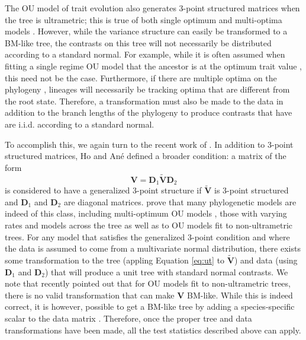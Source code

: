 The OU model of trait evolution also generates 3-point structured matrices when the tree is ultrametric; this is true of both single optimum and multi-optima models \citep{Ho2014}.
However, while the variance structure can easily be transformed to a BM-like tree, the contrasts on this tree will not necessarily be distributed according to a standard normal. For example, while it is often assumed when fitting a single regime OU model that the ancestor is at the optimum trait value \citep[see, for example][]{Harmon2010}, this need not be the case. Furthermore, if there are multiple optima on the phylogeny \citep{Hansen1997, ButlerKing2004, IngramMahler2013, UyedaBayou}, lineages will necessarily be tracking optima that are different from the root state. Therefore, a transformation must also be made to the data in addition to the branch lengths of the phylogeny to produce contrasts that have are i.i.d. according to a standard normal.

To accomplish this, we again turn to the recent work of \citet{Ho2014}. In addition to 3-point structured matrices, Ho and An\'{e} defined a broader condition: a matrix of the form
\[\mathbf{V}=\mathbf{D}_{\text{1}} \widetilde{\mathbf{V}}\mathbf{D}_{\text{2}}\]
is considered to have a generalized 3-point structure if $\widetilde{\mathbf{V}}$ is 3-point structured and $\mathbf{D}_{\text{1}}$ and $\mathbf{D}_{\text{2}}$ are diagonal matrices. \citet{Ho2014} prove that many phylogenetic models are indeed of this class, including multi-optimum OU models \citep{ButlerKing2004, IngramMahler2013, UyedaBayou}, those with varying rates and models across the tree \citep[e.g.,][]{Beaulieu2012} as well as to OU models fit to non-ultrametric trees. For any model that satisfies the generalized 3-point condition and where the data is assumed to come from a multivariate normal distribution, there exists some transformation to the tree (appling Equation \ref{eq:ut} to $\widetilde{\mathbf{V}}$) and data (using $\mathbf{D}_{\text{1}}$ and $\mathbf{D}_{\text{2}}$) that will produce a unit tree with standard normal contrasts. We note that \citet{Slater2014} recently pointed out that for OU models fit to non-ultrametric trees, there is no valid transformation that can make $\mathbf{V}$ BM-like. While this is indeed correct, it is however, possible to get a BM-like tree by adding a species-specific scalar to the data matrix \citep{Ho2014}. Therefore, once the proper tree and data transformations have been made, all the test statistics described above can apply.

